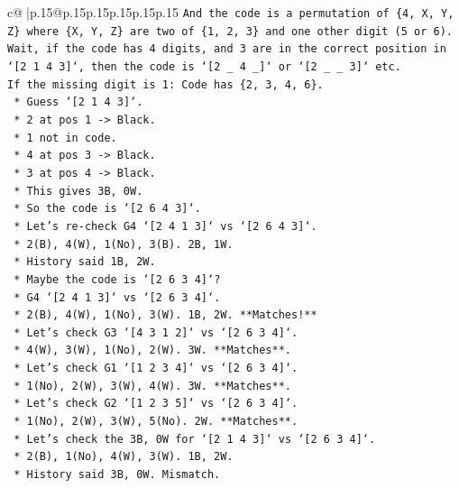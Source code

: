 \documentclass{article}
\begin{document}
{\begin{supertabular}{c@{$\;$}|p{.15\linewidth}@{}p{.15\linewidth}p{.15\linewidth}p{.15\linewidth}p{.15\linewidth}p{.15\linewidth}}
{{{\texttt{And the code is a permutation of \{4, X, Y, Z\} where \{X, Y, Z\} are two of \{1, 2, 3\} and one other digit (5 or 6).} \\
\texttt{Wait, if the code has 4 digits, and 3 are in the correct position in `{[}2 1 4 3{]}`, then the code is `{[}2 \_ 4 \_{]}` or `{[}2 \_ \_ 3{]}` etc.} \\
\texttt{If the missing digit is 1: Code has \{2, 3, 4, 6\}.} \\
\texttt{    *   Guess `{[}2 1 4 3{]}`.} \\
\texttt{    *   2 at pos 1 {-}> Black.} \\
\texttt{    *   1 not in code.} \\
\texttt{    *   4 at pos 3 {-}> Black.} \\
\texttt{    *   3 at pos 4 {-}> Black.} \\
\texttt{    *   This gives 3B, 0W.} \\
\texttt{    *   So the code is `{[}2 6 4 3{]}`.} \\
\texttt{    *   Let's re{-}check G4 `{[}2 4 1 3{]}` vs `{[}2 6 4 3{]}`.} \\
\texttt{        *   2(B), 4(W), 1(No), 3(B). 2B, 1W.} \\
\texttt{        *   History said 1B, 2W.} \\
\texttt{    *   Maybe the code is `{[}2 6 3 4{]}`?} \\
\texttt{        *   G4 `{[}2 4 1 3{]}` vs `{[}2 6 3 4{]}`.} \\
\texttt{        *   2(B), 4(W), 1(No), 3(W). 1B, 2W. **Matches!**} \\
\texttt{    *   Let's check G3 `{[}4 3 1 2{]}` vs `{[}2 6 3 4{]}`.} \\
\texttt{        *   4(W), 3(W), 1(No), 2(W). 3W. **Matches**.} \\
\texttt{    *   Let's check G1 `{[}1 2 3 4{]}` vs `{[}2 6 3 4{]}`.} \\
\texttt{        *   1(No), 2(W), 3(W), 4(W). 3W. **Matches**.} \\
\texttt{    *   Let's check G2 `{[}1 2 3 5{]}` vs `{[}2 6 3 4{]}`.} \\
\texttt{        *   1(No), 2(W), 3(W), 5(No). 2W. **Matches**.} \\
\texttt{    *   Let's check the 3B, 0W for `{[}2 1 4 3{]}` vs `{[}2 6 3 4{]}`.} \\
\texttt{        *   2(B), 1(No), 4(W), 3(W). 1B, 2W.} \\
\texttt{        *   History said 3B, 0W. Mismatch.} \\
}}}
\end{supertabular}}
\end{document}
